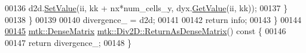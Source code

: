 \begin{DoxyCode}
00136       d2d.\hyperlink{classmtk_1_1DenseMatrix_a784ce5784109ac86bfb9d8562b334b13}{SetValue}(ii, kk + nx*num\_cells\_y, dyx.\hyperlink{classmtk_1_1DenseMatrix_a4b23ecbebd970b5eea915dbb50691024}{GetValue}(ii, kk));
00137     \}
00138   \}
00139 
00140   divergence\_ = d2d;
00141 
00142   \textcolor{keywordflow}{return} info;
00143 \}
00144 
\hypertarget{mtk__div__2d_8cc_source_l00145}{}\hyperlink{classmtk_1_1Div2D_ae4f880fb28ad2379906e9ac0dfaa4458}{00145} \hyperlink{classmtk_1_1DenseMatrix}{mtk::DenseMatrix} \hyperlink{classmtk_1_1Div2D_ae4f880fb28ad2379906e9ac0dfaa4458}{mtk::Div2D::ReturnAsDenseMatrix}()\textcolor{keyword}{ const }\{
00146 
00147   \textcolor{keywordflow}{return} divergence\_;
00148 \}
\end{DoxyCode}
